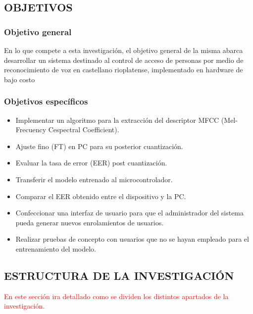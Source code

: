 \subsection{OBJETIVOS}

\subsubsection{Objetivo general}
En lo que compete a esta investigación, el objetivo general de la misma abarca desarrollar
un sistema destinado al control de acceso de personas por medio de reconocimiento de voz en
castellano rioplatense, implementado en hardware de bajo costo

\subsubsection{Objetivos específicos}
\begin{itemize}
    \item  Implementar un algoritmo para la extracción del descriptor MFCC (Mel-Frecuency
Cespectral Coefficient).
    \item Ajuste fino (FT) en PC para su posterior cuantización.
    \item  Evaluar la tasa de error (EER) post cuantización.
    \item Transferir el modelo entrenado al microcontrolador.
    \item Comparar el EER obtenido entre el dispositivo y la PC.
    \item Confeccionar una interfaz de usuario para que el administrador del sistema pueda
generar nuevos enrolamientos de usuarios.
    \item Realizar pruebas de concepto con usuarios que no se hayan empleado para el
entrenamiento del modelo.
\end{itemize}

\subsection{ESTRUCTURA DE LA INVESTIGACIÓN}
\textcolor{red}{En este sección ira detallado como se dividen los distintos apartados de la investigación.}